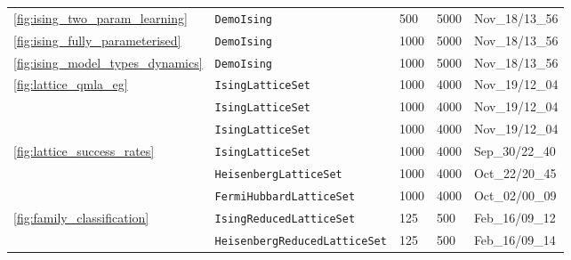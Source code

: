 \begin{tabular}{lllll}
\cref{fig:ising_two_param_learning} & \texttt{DemoIsing} &                                      500 &                                     5000 &                           Nov\_18/13\_56 \\
\cref{fig:ising_fully_parameterised} & \texttt{DemoIsing} &                                     1000 &                                     5000 &                           Nov\_18/13\_56 \\
\cref{fig:ising_model_types_dynamics} & \texttt{DemoIsing} &                                     1000 &                                     5000 &                           Nov\_18/13\_56 \\
\cline{1-5}
\multirow{3}{*}{\cref{fig:lattice_qmla_eg}} & \texttt{IsingLatticeSet} &                                     1000 &                                     4000 &                           Nov\_19/12\_04 \\
                                 & \texttt{IsingLatticeSet} &                                     1000 &                                     4000 &                           Nov\_19/12\_04 \\
                                 & \texttt{IsingLatticeSet} &                                     1000 &                                     4000 &                           Nov\_19/12\_04 \\
\cline{1-5}
\multirow{3}{*}{\cref{fig:lattice_success_rates}} & \texttt{IsingLatticeSet} &                                     1000 &                                     4000 &                           Sep\_30/22\_40 \\
                                 & \texttt{HeisenbergLatticeSet} &                                     1000 &                                     4000 &                           Oct\_22/20\_45 \\
                                 & \texttt{FermiHubbardLatticeSet} &                                     1000 &                                     4000 &                           Oct\_02/00\_09 \\
\cline{1-5}
\multirow{12}{*}{\cref{fig:family_classification}} & \texttt{IsingReducedLatticeSet} &                                      125 &                                      500 &                           Feb\_16/09\_12 \\
                                 & \texttt{HeisenbergReducedLatticeSet} &                                      125 &                                      500 &                           Feb\_16/09\_14 \\

\end{tabular}
